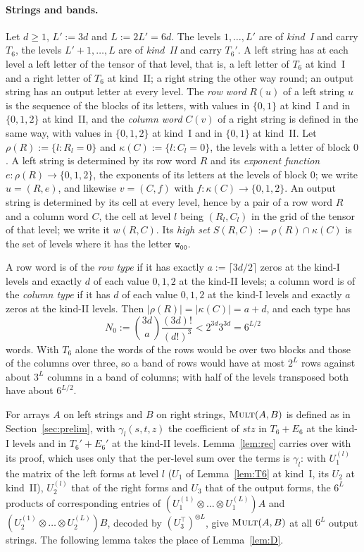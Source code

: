 \documentclass[11pt]{article}
\theoremstyle{definition}
\theoremstyle{remark}
\newcommand{\Mult}{\textnormal{\textsc{Mult}}}
\newcommand{\Nz}{N_0}
\newcommand{\tl}[1]{\mathtt{#1}}
\begin{document}
\paragraph{Strings and bands.} Let $d\ge1$, $L':=3d$ and $L:=2L'=6d$. The levels $1,\dots,L'$ are of \emph{kind~I} and carry $T_6$, the levels $L'+1,\dots,L$ are of \emph{kind~II} and carry $T_6'$. A left string has at each level a left letter of the tensor of that level, that is, a left letter of $T_6$ at kind~I and a right letter of $T_6$ at kind~II; a right string the other way round; an output string has an output letter at every level. The \emph{row word} $R(u)$ of a left string $u$ is the sequence of the blocks of its letters, with values in $\{0,1\}$ at kind~I and in $\{0,1,2\}$ at kind~II, and the \emph{column word} $C(v)$ of a right string is defined in the same way, with values in $\{0,1,2\}$ at kind~I and in $\{0,1\}$ at kind~II. Let $\rho(R):=\{l:R_l=0\}$ and $\kappa(C):=\{l:C_l=0\}$, the levels with a letter of block $0$. A left string is determined by its row word $R$ and its \emph{exponent function} $e:\rho(R)\to\{0,1,2\}$, the exponents of its letters at the levels of block $0$; we write $u=(R,e)$, and likewise $v=(C,f)$ with $f:\kappa(C)\to\{0,1,2\}$. An output string is determined by its cell at every level, hence by a pair of a row word $R$ and a column word $C$, the cell at level $l$ being $(R_l,C_l)$ in the grid of the tensor of that level; we write it $w(R,C)$. Its \emph{high set} $S(R,C):=\rho(R)\cap\kappa(C)$ is the set of levels where it has the letter $\tl{w_{00}}$.

A row word is of the \emph{row type} if it has exactly $a:=\lceil3d/2\rceil$ zeros at the kind-I levels and exactly $d$ of each value $0,1,2$ at the kind-II levels; a column word is of the \emph{column type} if it has $d$ of each value $0,1,2$ at the kind-I levels and exactly $a$ zeros at the kind-II levels. Then $|\rho(R)|=|\kappa(C)|=a+d$, and each type has
\[
\Nz:=\binom{3d}a\frac{(3d)!}{(d!)^3}<2^{3d}3^{3d}=6^{L/2}
\]
words. With $T_6$ alone the words of the rows would be over two blocks and those of the columns over three, so a band of rows would have at most $2^L$ rows against about $3^L$ columns in a band of columns; with half of the levels transposed both have about $6^{L/2}$.

For arrays $A$ on left strings and $B$ on right strings, $\Mult(A,B)$ is defined as in Section~\ref{sec:prelim}, with $\gamma_l(s,t,z)$ the coefficient of $stz$ in $T_6+E_6$ at the kind-I levels and in $T_6'+E_6'$ at the kind-II levels. Lemma~\ref{lem:rec} carries over with its proof, which uses only that the per-level sum over the terms is $\gamma_l$: with $U_1^{(l)}$ the matrix of the left forms at level $l$ ($U_1$ of Lemma~\ref{lem:T6} at kind~I, its $U_2$ at kind~II), $U_2^{(l)}$ that of the right forms and $U_3$ that of the output forms, the $6^L$ products of corresponding entries of $(U_1^{(1)}\otimes\dots\otimes U_1^{(L)})A$ and $(U_2^{(1)}\otimes\dots\otimes U_2^{(L)})B$, decoded by $(U_3^\top)^{\otimes L}$, give $\Mult(A,B)$ at all $6^L$ output strings. The following lemma takes the place of Lemma~\ref{lem:D}.
\end{document}
